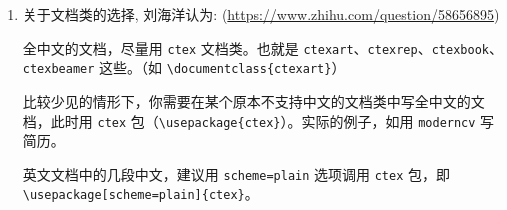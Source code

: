 \documentclass[UTF8,no-math]{ctexart}
\numberwithin{enumi}{section}
\begin{document}
    \begin{enumerate}
        \item 关于文档类的选择, 刘海洋认为: (\url{https://www.zhihu.com/question/58656895})
        \begin{bdquote}[indent]
        全中文的文档，尽量用 \texttt{ctex} 文档类。也就是 \texttt{ctexart}、\texttt{ctexrep}、\texttt{ctexbook}、\texttt{ctexbeamer} 这些。（如 \verb|\documentclass{ctexart}|）
        
        比较少见的情形下，你需要在某个原本不支持中文的文档类中写全中文的文档，此时用 \texttt{ctex} 包（\verb|\usepackage{ctex}|）。实际的例子，如用 \texttt{moderncv} 写简历。
        
        英文文档中的几段中文，建议用 \verb|scheme=plain| 选项调用 \texttt{ctex} 包，即\\ \verb|\usepackage[scheme=plain]{ctex}|。
        

\end{bdquote}
\end{enumerate}
\end{document}
